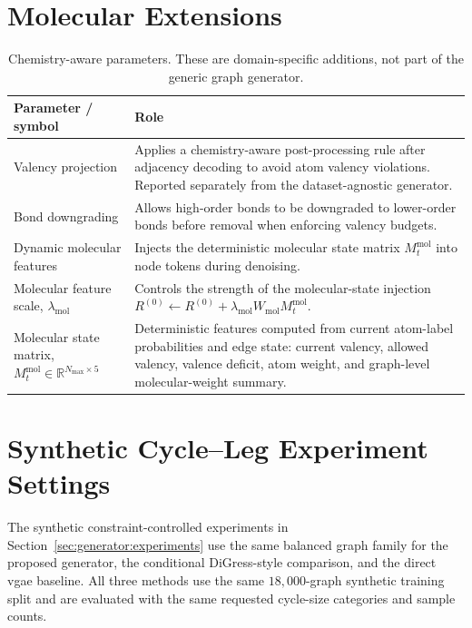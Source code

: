 \section{Molecular Extensions}

\begin{table}[p]
\centering
\footnotesize
\begin{tabularx}{\textwidth}{@{}p{}X@{}}
\toprule
Parameter / symbol & Role \\
\midrule
Valency projection & Applies a chemistry-aware post-processing rule after adjacency decoding to avoid atom valency violations. Reported separately from the dataset-agnostic generator. \\
Bond downgrading & Allows high-order bonds to be downgraded to lower-order bonds before removal when enforcing valency budgets. \\
Dynamic molecular features & Injects the deterministic molecular state matrix \(M_t^{\mathrm{mol}}\) into node tokens during denoising. \\
Molecular feature scale, \(\lambda_{\mathrm{mol}}\) & Controls the strength of the molecular-state injection \(R^{(0)}\leftarrow R^{(0)}+\lambda_{\mathrm{mol}}W_{\mathrm{mol}}M_t^{\mathrm{mol}}\). \\
Molecular state matrix, \(M_t^{\mathrm{mol}}\in\mathbb{R}^{N_{\max}\times 5}\) & Deterministic features computed from current atom-label probabilities and edge state: current valency, allowed valency, valence deficit, atom weight, and graph-level molecular-weight summary. \\
\bottomrule
\end{tabularx}
\caption{Chemistry-aware parameters. These are domain-specific additions, not part of the generic graph generator.}
\label{tab:generator-molecular-parameters}
\end{table}

\section{Synthetic Cycle--Leg Experiment Settings}

The synthetic constraint-controlled experiments in
Section~\ref{sec:generator:experiments} use the same balanced graph family for
the proposed generator, the conditional DiGress-style comparison, and the direct
\gls{vgae} baseline. All three methods use the same \(18{,}000\)-graph
synthetic training split and are evaluated with the same requested cycle-size
categories and sample counts.

